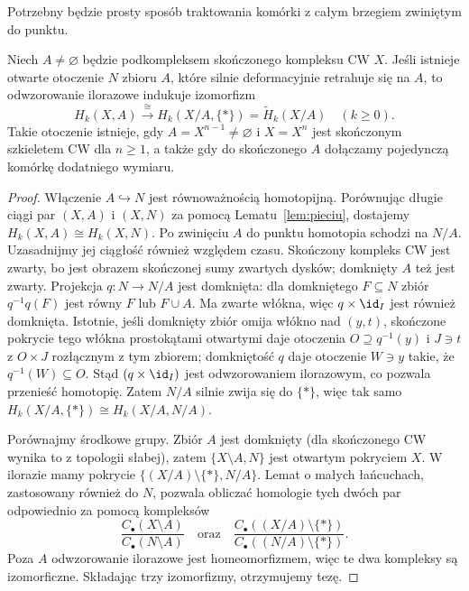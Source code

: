 Potrzebny będzie prosty sposób traktowania
komórki z całym brzegiem zwiniętym do punktu.

\begin{lemat}
\label{lem:iloraz-cw-homologia}
Niech $A\ne\varnothing$ będzie podkompleksem skończonego
kompleksu CW $X$. Jeśli istnieje otwarte
otoczenie $N$ zbioru $A$, które silnie
deformacyjnie retrahuje się na $A$, to
odwzorowanie ilorazowe indukuje izomorfizm
\[
 H_k(X,A)\xrightarrow{\ \cong\ }
 H_k(X/A,\{*\})=\widetilde H_k(X/A)
 \quad(k\geq0).
\]
Takie otoczenie istnieje, gdy
$A=X^{n-1}\ne\varnothing$ i $X=X^n$ jest skończonym
szkieletem CW dla $n\geq1$, a także gdy do skończonego $A$
dołączamy pojedynczą komórkę dodatniego wymiaru.
\end{lemat}
\begin{proof}
Włączenie $A\hookrightarrow N$ jest
równoważnością homotopijną. Porównując
długie ciągi par $(X,A)$ i $(X,N)$
za pomocą Lematu~\ref{lem:pieciu},
dostajemy $H_k(X,A)\cong H_k(X,N)$.
Po zwinięciu $A$ do punktu homotopia schodzi na $N/A$.
Uzasadnijmy jej ciągłość również względem czasu.
Skończony kompleks CW jest zwarty, bo jest obrazem skończonej
sumy zwartych dysków; domknięty $A$ też jest zwarty.
Projekcja $q:N\to N/A$ jest domknięta: dla domkniętego $F\subseteq N$
zbiór $q^{-1}q(F)$ jest równy $F$ lub $F\cup A$.
Ma zwarte włókna, więc $q\times\id_I$ jest również domknięta.
Istotnie, jeśli domknięty zbiór omija włókno nad $(y,t)$,
skończone pokrycie tego włókna prostokątami otwartymi daje
otoczenia $O\supseteq q^{-1}(y)$ i $J\ni t$ z $O\times J$
rozłącznym z tym zbiorem; domkniętość $q$ daje otoczenie
$W\ni y$ takie, że $q^{-1}(W)\subseteq O$.
Stąd $(q\times\id_I)$ jest odwzorowaniem ilorazowym,
co pozwala przenieść homotopię. Zatem $N/A$ silnie zwija się do $\{*\}$,
więc tak samo
$H_k(X/A,\{*\})\cong H_k(X/A,N/A)$.

Porównajmy środkowe grupy.
Zbiór $A$ jest domknięty
(dla skończonego CW wynika to
z topologii słabej), zatem
$\{X\setminus A,N\}$ jest
otwartym pokryciem $X$.
W ilorazie mamy pokrycie
$\{(X/A)\setminus\{*\},N/A\}$.
Lemat o małych łańcuchach,
zastosowany również do $N$,
pozwala obliczać homologie
tych dwóch par odpowiednio za pomocą kompleksów
\[
 \frac{C_\bullet(X\setminus A)}
      {C_\bullet(N\setminus A)}
 \quad\text{oraz}\quad
 \frac{C_\bullet((X/A)\setminus\{*\})}
      {C_\bullet((N/A)\setminus\{*\})}.
\]
Poza $A$ odwzorowanie ilorazowe jest
homeomorfizmem, więc te dwa
kompleksy są izomorficzne.
Składając trzy izomorfizmy,
otrzymujemy tezę.


\end{proof}
